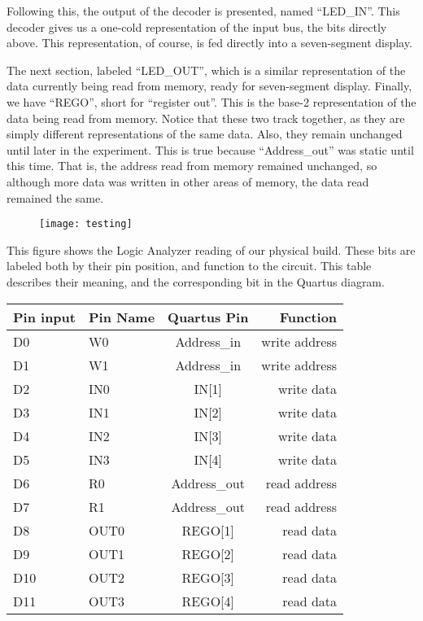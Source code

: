 \documentclass[titlepage]{article}
\begin{document}
        Following this, the output of the decoder is presented, named ``LED\_IN''.  This decoder gives us a one-cold representation of the input bus, the bits directly above.  This representation, of course, is fed directly into a seven-segment display.
        
        The next section, labeled ``LED\_OUT'', 
        which is a similar representation of the data currently being read from memory, ready for seven-segment display.
        Finally, we have ``REGO'', short for ``register out''.  This is the base-2 representation of the data being read from memory.
        Notice that these two track together, as they are simply different representations of the same data.
        Also, they remain unchanged until later in the experiment.  This is true because ``Address\_out'' was static until this time.  That is, the address read from memory remained unchanged, so although more data was written in other areas of memory, the data read remained the same.
        
        \begin{figure}[h]
        	\centering
        	\texttt{[image: testing]}
        \end{figure}
        
        This figure shows the Logic Analyzer reading of our physical build.
        These bits are labeled both by their pin position, and function to the circuit.  This table describes their meaning, and the corresponding bit in the Quartus diagram.
        
        \begin{tabular}{llc | r}
            Pin input & Pin Name & Quartus Pin & Function \\
            \hline
            D0 & W0 & Address\_in & write address \\
            D1 & W1 & Address\_in & write address \\
            D2 & IN0 & IN[1] & write data \\
            D3 & IN1 & IN[2] & write data \\
            D4 & IN2 & IN[3] & write data \\
            D5 & IN3 & IN[4] & write data \\
            D6 & R0 & Address\_out & read address \\
            D7 & R1 & Address\_out & read address \\
            D8 & OUT0 & REGO[1] & read data \\
            D9 & OUT1 & REGO[2] & read data \\
            D10 & OUT2 & REGO[3] & read data \\
            D11 & OUT3 & REGO[4] & read data \\
            
        \end{tabular}
        
\end{document}
